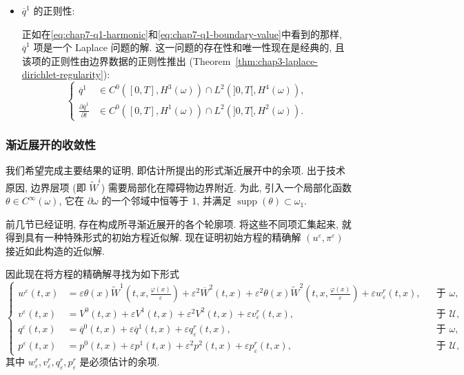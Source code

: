 \begin{sloppypar}
\begin{itemize}
\item $\overline q^1$ 的正则性:

正如在\eqref{eq:chap7-q1-harmonic}和\eqref{eq:chap7-q1-boundary-value}中看到的那样, $\overline q^1$ 项是一个 Laplace 问题的解. 这一问题的存在性和唯一性现在是经典的, 且该项的正则性由边界数据的正则性推出 (Theorem~\ref{thm:chap3-laplace-dirichlet-regularity}):
\[
\left\{
\begin{aligned}
 \overline q^1&\in C^0([0,T],H^3(\omega))\cap L^2(]0,T[,H^4(\omega)),\\
 \frac{\partial\overline q^1}{\partial t}&\in C^0([0,T],H^1(\omega))\cap L^2(]0,T[,H^2(\omega)).
\end{aligned}
\right.
\]
\end{itemize}

\subsubsection{渐近展开的收敛性}
\label{subsec:chap7-asymptotic-convergence}

我们希望完成主要结果的证明, 即估计所提出的形式渐近展开中的余项. 出于技术原因, 边界层项 (即 $\widetilde W^i$) 需要局部化在障碍物边界附近. 为此, 引入一个局部化函数 $\theta\in C^\infty(\omega)$, 它在 $\partial\omega$ 的一个邻域中恒等于 $1$, 并满足 $\operatorname{supp}(\theta)\subset\omega_1$.

前几节已经证明, 存在构成所寻渐近展开的各个轮廓项. 将这些不同项汇集起来, 就得到具有一种特殊形式的初始方程近似解. 现在证明初始方程的精确解 $(u^\varepsilon,\pi^\varepsilon)$ 接近如此构造的近似解.

因此现在将方程的精确解寻找为如下形式
\[
\left\{
\begin{aligned}
 w^\varepsilon(t,x)&=\varepsilon\theta(x)\widetilde W^1\left(t,x,\frac{\varphi(x)}\varepsilon\right)
 +\varepsilon^2\overline W^2(t,x)
 +\varepsilon^2\theta(x)\widetilde W^2\left(t,x,\frac{\varphi(x)}\varepsilon\right)
 +\varepsilon w_\varepsilon^r(t,x),&&\text{于 }\omega,\\
 v^\varepsilon(t,x)&=V^0(t,x)+\varepsilon V^1(t,x)+\varepsilon^2V^2(t,x)
 +\varepsilon v_\varepsilon^r(t,x),&&\text{于 }\mathcal U,\\
 q^\varepsilon(t,x)&=\overline q^0(t,x)+\varepsilon\overline q^1(t,x)
 +\varepsilon q_\varepsilon^r(t,x),&&\text{于 }\omega,\\
 p^\varepsilon(t,x)&=p^0(t,x)+\varepsilon p^1(t,x)+\varepsilon^2p^2(t,x)
 +\varepsilon p_\varepsilon^r(t,x),&&\text{于 }\mathcal U,
\end{aligned}
\right.
\]
其中 $w_\varepsilon^r,v_\varepsilon^r,q_\varepsilon^r,p_\varepsilon^r$ 是必须估计的余项.


\end{sloppypar}
